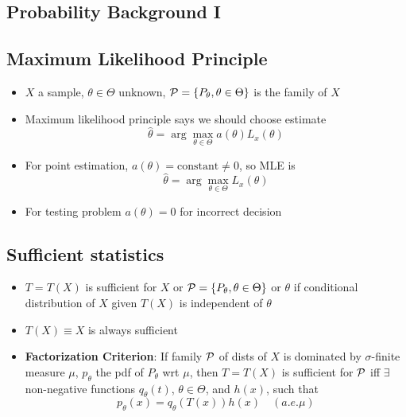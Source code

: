 \documentclass[fontsize=5pt]{scrartcl}
\begin{document}
\begin{multicols}{2}
\section{Probability Background I}

\subsection{Maximum Likelihood Principle}

\begin{itemize}
\item $X$ a sample, $\theta\in\Theta$ unknown, ${\cal
    P}=\{P_{\theta},\theta\in\Theta\}$ is the family of $X$

\item Maximum likelihood principle says we should choose estimate
  \begin{equation}
    \hat{\theta} = \arg\max_{\theta\in\Theta} a(\theta)L_{x}(\theta)
  \end{equation}
\item For point estimation, $a(\theta)=\text{constant}\neq 0$, so MLE
  is
  \begin{equation}
    \hat{\theta} = \arg\max_{\theta\in\Theta} L_{x}(\theta)
  \end{equation}


\item For testing problem $a(\theta) =0$ for incorrect decision

\end{itemize}

\subsection{Sufficient statistics}

\begin{itemize}
\item $T=T(X)$ is sufficient for $X$ or ${\cal
    P}=\{P_{\theta},\theta\in\Theta\}$ or $\theta$ if conditional
  distribution of $X$ given $T(X)$ is independent of $\theta$
\item $T(X)\equiv X$ is always sufficient

\item \textbf{Factorization Criterion}: If family ${\cal P}$ of dists
  of $X$ is dominated by $\sigma$-finite measure $\mu$, $p_{\theta}$
  the pdf of $P_{\theta}$ wrt $\mu$, then $T=T(X)$ is sufficient for
  ${\cal P}$ iff $\exists$ non-negative functions $q_{\theta}(t)$,
  $\theta\in\Theta$, and $h(x)$, such that
  \begin{equation}
    p_{\theta}(x) = q_{\theta}(T(x))h(x)\quad (a.e. \mu)
  \end{equation}


\end{itemize}
\end{multicols}
\end{document}
